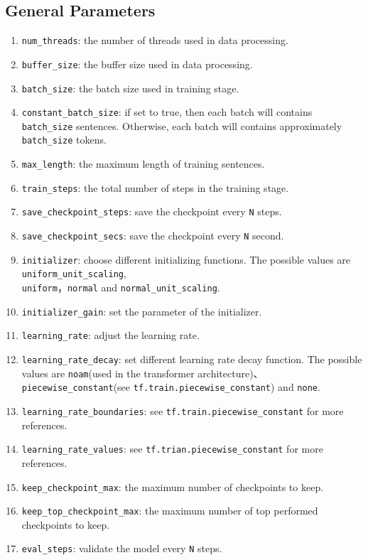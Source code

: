 \documentclass{article}
\begin{document}
\subsection{General Parameters}
\begin{enumerate}
\item \verb|num_threads|: the number of threads used in data processing.
\item \verb|buffer_size|: the buffer size used in data processing.
\item \verb|batch_size|: the batch size used in training stage.
\item \verb|constant_batch_size|: if set to true, then each batch will contains \verb|batch_size| sentences. Otherwise, each batch will contains approximately \verb|batch_size| tokens.
\item \verb|max_length|: the maximum length of training sentences.
\item \verb|train_steps|: the total number of steps in the training stage.
\item \verb|save_checkpoint_steps|: save the checkpoint every \verb|N| steps.
\item \verb|save_checkpoint_secs|: save the checkpoint every \verb|N| second.
\item \verb|initializer|: choose different initializing functions. The possible values are \verb|uniform_unit_scaling|,\\ \verb|uniform|，\verb|normal| and \verb|normal_unit_scaling|.
\item \verb|initializer_gain|: set the parameter of the initializer.
\item \verb|learning_rate|: adjust the learning rate.
\item \verb|learning_rate_decay|: set different learning rate decay function. The possible values are \verb|noam|(used in the transformer architecture)、\verb|piecewise_constant|(see \verb|tf.train.piecewise_constant|) and \verb|none|.
\item \verb|learning_rate_boundaries|: see \verb|tf.train.piecewise_constant| for more references.
\item \verb|learning_rate_values|: see \verb|tf.trian.piecewise_constant| for more references.
\item \verb|keep_checkpoint_max|: the maximum number of checkpoints to keep.
\item \verb|keep_top_checkpoint_max|: the maximum number of top performed checkpoints to keep.
\item \verb|eval_steps|: validate the model every \verb|N| steps.

\end{enumerate}
\end{document}
